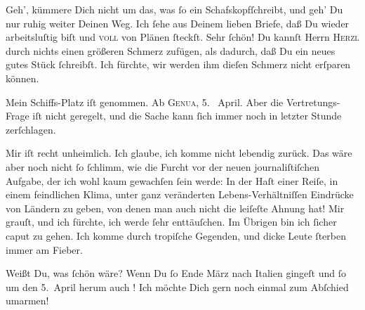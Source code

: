 \pstart
           Geh’, kümmere Dich nicht um das, was{ }ſo ein Schafskopfſchreibt, und geh’ Du nur ruhig weiter Deinen Weg.
               Ich{ }ſehe aus Deinem lieben Briefe, daß Du wieder arbeitsluſtig biſt und \textsc{voll} von Plänen{ }ſteckſt. Sehr{ }ſchön! Du kannſt Herrn \textsc{Herzl} durch nichts einen größeren Schmerz zufügen, als dadurch, daß Du ein neues
               gutes Stück{ }ſchreibſt. Ich fürchte, wir werden ihm dieſen Schmerz nicht erſparen
               können.\pend
           
\pstart
           Mein Schiffs-Platz iſt
               genommen. Ab \textsc{Genua}, 5.  April.
               Aber die Vertretungs-Frage iſt
               nicht geregelt, und die {\pb}Sache kann{ }ſich immer noch
               in letzter Stunde zerſchlagen.\pend
           
\pstart
           Mir iſt recht unheimlich. Ich glaube, ich komme nicht lebendig zurück. Das wäre aber
               noch nicht{ }ſo{ }ſchlimm, wie die Furcht vor der neuen journaliſtiſchen Aufgabe, der ich
                  \strikeout{\textcolor{gray}{w}} wohl kaum gewachſen{ }ſein werde: In der Haſt einer Reiſe, in einem feindlichen
               Klima, unter ganz veränderten Lebens-Verhältniſſen Eindrücke von Ländern zu geben,
                  \strikeout{\textcolor{gray}{×}}{ } von denen man auch nicht die
               leiſeſte Ahnung hat! Mir grauſt, und ich fürchte, ich werde{ }ſehr enttäuſchen. Im
               Übrigen bin ich{ }ſicher caput zu gehen. Ich komme durch tropiſche {\pb}Gegenden, und dicke Leute{ }ſterben immer am
               Fieber.\pend
           
\pstart
           Weißt Du, was{ }ſchön wäre? Wenn Du{ }ſo  Ende März nach Italien gingeſt und{ }ſo um den 5. April herum
               auch \label{K_L02841-2v}\label{K_L02841-2}!
               Ich möchte Dich gern noch einmal zum Abſchied umarmen!\pend
           
